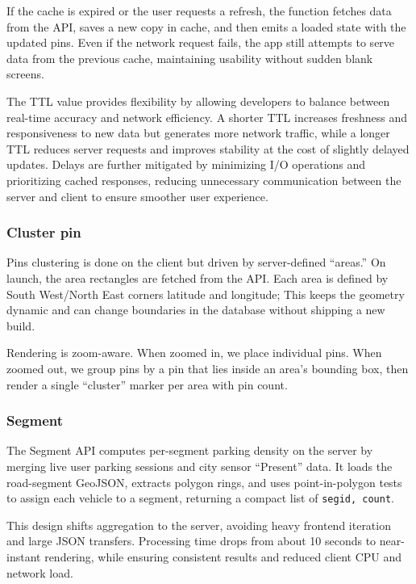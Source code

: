 If the cache is expired or the user requests a refresh, the function fetches data from the API, saves a new copy in cache, and then emits a loaded state with the updated pins. Even if the network request fails, the app still attempts to serve data from the previous cache, maintaining usability without sudden blank screens.

The TTL value provides flexibility by allowing developers to balance between real-time accuracy and network efficiency. A shorter TTL increases freshness and responsiveness to new data but generates more network traffic, while a longer TTL reduces server requests and improves stability at the cost of slightly delayed updates. Delays are further mitigated by minimizing I/O operations and prioritizing cached responses, reducing unnecessary communication between the server and client to ensure smoother user experience.


\subsubsection{Cluster pin}

Pins clustering is done on the client but driven by server-defined “areas.” On launch, the area rectangles are fetched from the API. Each area is defined by South West/North East corners latitude and longitude; This keeps the geometry dynamic and can change boundaries in the database without shipping a new build.

Rendering is zoom-aware. When zoomed in, we place individual pins. When zoomed out, we group pins by a pin that lies inside an area’s bounding box, then render a single “cluster” marker per area with pin count. 


\subsubsection{Segment}

The Segment API computes per-segment parking density on the server by merging live user parking sessions and city sensor “Present” data. It loads the road-segment GeoJSON, extracts polygon rings, and uses point-in-polygon tests to assign each vehicle to a segment, returning a compact list of \texttt{{segid, count}}.

This design shifts aggregation to the server, avoiding heavy frontend iteration and large JSON transfers. Processing time drops from about 10 seconds to near-instant rendering, while ensuring consistent results and reduced client CPU and network load.

